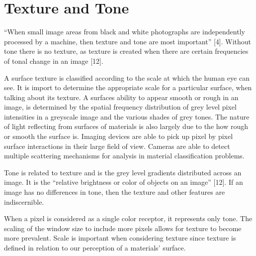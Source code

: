 \section{Texture and Tone}

“When small image areas from black and white photographs are independently processed by a machine, then texture and tone are most important” [4].  Without tone there is no texture, as texture is created when there are certain frequencies of tonal change in an image [12].

A surface texture is classified according to the scale at which the human eye can see.  It is import to determine the appropriate scale for a particular surface, when talking about its texture.  A surfaces ability to appear smooth or rough in an image, is determined by the spatial frequency distribution of grey level pixel intensities in a greyscale image and the various shades of grey tones.  The nature of light reflecting from surfaces of materials is also largely due to the how rough or smooth the surface is.  Imaging devices are able to pick up pixel by pixel surface interactions in their large field of view.  Cameras are able to detect multiple scattering mechanisms for analysis in material classification problems.

Tone is related to texture and is the grey level gradients distributed across an image.  It is the “relative brightness or color of objects on an image” [12].  If an image has no differences in tone, then the texture and other features are indiscernible.

When a pixel is considered as a single color receptor, it represents only tone.  The scaling of the window size to include more pixels allows for texture to become more prevalent.   Scale is important when considering texture since texture is defined in relation to our perception of a materials' surface.



